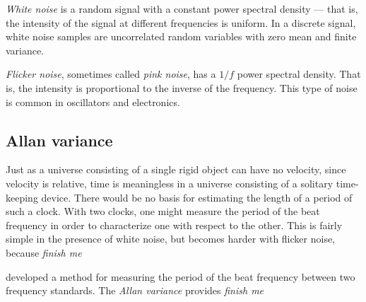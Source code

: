 \documentclass[12pt]{article}
\begin{document}
\textit{White noise} is a random signal with a constant power spectral density --- that is, the intensity of the signal at different frequencies is uniform. In a discrete signal, white noise samples are uncorrelated random variables with zero mean and finite variance.

\textit{Flicker noise}, sometimes called \textit{pink noise}, has a $1/f$ power spectral density. That is, the intensity is proportional to the inverse of the frequency. This type of noise is common in oscillators and electronics.

\subsection{Allan variance}
Just as a universe consisting of a single rigid object can have no velocity, since velocity is relative, time is meaningless in a universe consisting of a solitary time-keeping device. There would be no basis for estimating the length of a period of such a clock. With two clocks, one might measure the period of the beat frequency in order to characterize one with respect to the other. This is fairly simple in the presence of white noise, but becomes harder with flicker noise, because \textit{finish me}

\citet{Allan1966} developed a method for measuring the period of the beat frequency between two frequency standards. The \textit{Allan variance} provides \textit{finish me}



\end{document}
